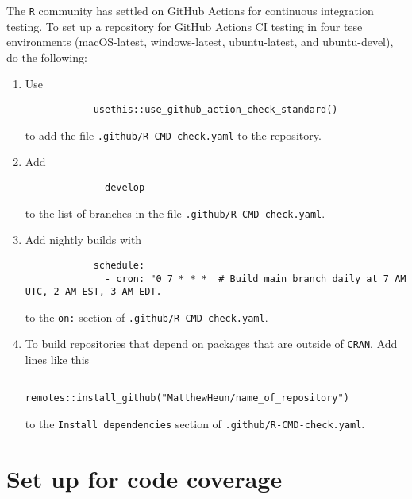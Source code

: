 \documentclass{article}
\begin{document}
The \texttt{R} community has settled on GitHub Actions for continuous integration testing.
To set up a repository for GitHub Actions CI testing in four tese environments
(macOS-latest, windows-latest, ubuntu-latest, and ubuntu-devel), 
do the following:
%
\begin{enumerate}

  \item Use 
  		\begin{verbatim}
			usethis::use_github_action_check_standard()
  	 	\end{verbatim}
		to add the file \texttt{.github/R-CMD-check.yaml} 
		to the repository.
        
  \item Add 
  		\begin{verbatim}
			- develop
		\end{verbatim}
		to the list of branches in the file \texttt{.github/R-CMD-check.yaml}.
  
  \item Add nightly builds with 
  		\begin{verbatim}
			schedule:
			  - cron: "0 7 * * *  # Build main branch daily at 7 AM UTC, 2 AM EST, 3 AM EDT.
		\end{verbatim}
	    to the \texttt{on:} section of \texttt{.github/R-CMD-check.yaml}.\
		
  \item To build repositories that depend on packages that are outside of \texttt{CRAN}, 
		Add lines like this
	        \begin{verbatim}
				remotes::install_github("MatthewHeun/name_of_repository")
			\end{verbatim}
		to the \texttt{Install dependencies} section of
		\texttt{.github/R-CMD-check.yaml}.
		
\end{enumerate}


\section{Set up for code coverage}
\label{sec:codecov_setup}
\end{document}
